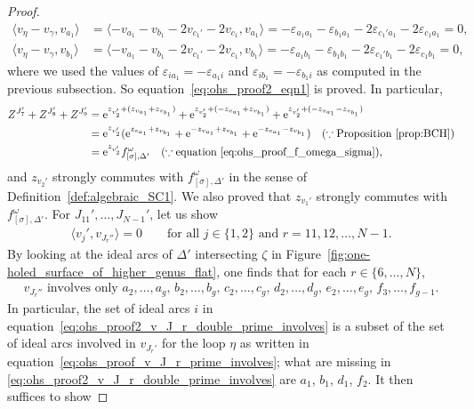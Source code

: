 \documentclass[pdftex]{sigma}
\numberwithin{equation}{section}
\theoremstyle{definition}
\begin{document}
\begin{proof}
\begin{align*}
\langle v_\eta - v_\gamma,v_{a_1} \rangle & = \langle -v_{a_1} - v_{b_1} -2v_{c_1'} - 2v_{c_1}, v_{a_1}\rangle = - \varepsilon_{a_1 a_1} - \varepsilon_{b_1 a_1} - 2\varepsilon_{c_1' a_1} - 2\varepsilon_{c_1 a_1} =0, \\
\langle v_\eta - v_\gamma,v_{b_1} \rangle & = \langle -v_{a_1} - v_{b_1} -2v_{c_1'} - 2v_{c_1}, v_{b_1}\rangle = - \varepsilon_{a_1 b_1} - \varepsilon_{b_1 b_1} - 2\varepsilon_{c_1' b_1} - 2\varepsilon_{c_1 b_1} = 0,
\end{align*}
where we used the values of $\varepsilon_{i a_1} = - \varepsilon_{a_1 i}$ and $\varepsilon_{i b_1} = - \varepsilon_{b_1 i}$ as computed in the previous subsection. So equation~\eqref{eq:ohs_proof2_eqn1} is proved. In particular,
\begin{align*}
Z^{J_7'} + Z^{J_8'} + Z^{J_9'} & = {\rm e}^{z_{v_2'} + (z_{v_{a_1}} + z_{v_{b_1}})} + {\rm e}^{z_{v_2'} + (- z_{v_{a_1}} + z_{v_{b_1}})} + {\rm e}^{z_{v_2'} + (-z_{v_{a_1}} - z_{v_{b_1}})} \\
& = {\rm e}^{z_{v_2'}}( {\rm e}^{z_{v_{a_1}} + z_{v_{b_1}}} + {\rm e}^{-z_{v_{a_1}} + z_{v_{b_1}}} + {\rm e}^{-z_{v_{a_1}} -z_{v_{b_1}}}) \quad (\because \mbox{Proposition~\ref{prop:BCH}}) \\
& = {\rm e}^{z_{v_2'}} f^\omega_{[\sigma],\Delta'} \quad (\because \mbox{equation~\eqref{eq:ohs_proof_f_omega_sigma}}),
\end{align*}
and $z_{v_2'}$ strongly commutes with $f^\omega_{[\sigma],\Delta'}$ in the sense of Definition~\ref{def:algebraic_SC1}. We also proved that $z_{v_1'}$ strongly commutes with $f^\omega_{[\sigma],\Delta'}$.
For $J_{11}',\dots,J_{N-1}'$, let us show
\begin{align}
\label{eq:ohs_proof2_eqn2}
\langle v_j', v_{J_r''}\rangle=0 \qquad \mbox{for all $j\in \{1,2\}$ and $r=11,12,\dots,N-1$}.
\end{align}
By looking at the ideal arcs of $\Delta'$ intersecting $\zeta$ in Figure~\ref{fig:one-holed_surface_of_higher_genus_flat}, one finds that for each $r\in\{6,\dots,N\}$,
\begin{align}
\label{eq:ohs_proof2_v_J_r_double_prime_involves}
\mbox{$v_{J_r''}$ involves only $a_2,\dots,a_g$, $b_2,\dots,b_g$, $c_2,\dots,c_g$, $d_2,\dots,d_g$, $e_2,\dots,e_g$, $f_3,\dots,f_{g-1}$.}\!\!\!
\end{align}
In particular, the set of ideal arcs $i$ in equation~\eqref{eq:ohs_proof2_v_J_r_double_prime_involves} is a subset of the set of ideal arcs involved in $v_{J_r'}$ for the loop $\eta$ as written in equation~\eqref{eq:ohs_proof_v_J_r_prime_involves}; what are missing in \eqref{eq:ohs_proof2_v_J_r_double_prime_involves} are $a_1$, $b_1$, $d_1$, $f_2$. It then suffices to show

\end{proof}
\end{document}
